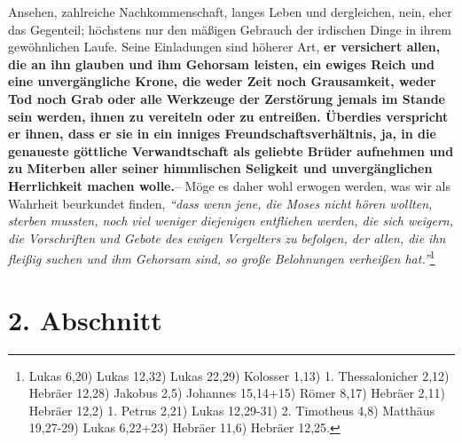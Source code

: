 Ansehen, zahlreiche Nachkommenschaft,
langes Leben und dergleichen, nein, eher das Gegenteil; höchstens nur den
mäßigen Gebrauch der irdischen Dinge in ihrem gewöhnlichen Laufe. Seine
Einladungen sind höherer Art,
\label{ref:16_01_warum_2}
\textbf{er versichert allen, die an ihn glauben und ihm
Gehorsam leisten, ein ewiges Reich und eine unvergängliche
Krone, die weder
Zeit noch Grausamkeit, weder Tod noch Grab oder alle Werkzeuge der Zerstörung
jemals im Stande sein werden, ihnen zu vereiteln oder zu entreißen. Überdies
verspricht er ihnen, dass er sie in ein inniges Freundschaftsverhältnis, ja, in
die genaueste göttliche Verwandtschaft als geliebte Brüder aufnehmen und zu
Miterben aller seiner himmlischen Seligkeit und unvergänglichen
Herrlichkeit
machen wolle.}-- Möge es daher wohl erwogen werden, was wir als Wahrheit
beurkundet finden,
\textit{"`dass wenn jene, die Moses nicht hören wollten, sterben
mussten, noch viel weniger diejenigen entfliehen werden, die sich weigern, die
Vorschriften und Gebote des ewigen Vergelters zu befolgen, der allen, die ihn
fleißig suchen und ihm Gehorsam sind, so große Belohnungen verheißen
hat."'}\footnote{
Lukas 6,20)
Lukas 12,32)
Lukas 22,29)
Kolosser 1,13)
1. Thessalonicher 2,12)
Hebräer 12,28)
Jakobus 2,5)
Johannes 15,14+15)
Römer 8,17)
Hebräer 2,11)
Hebräer 12,2)
1. Petrus 2,21)
Lukas 12,29-31)
2. Timotheus 4,8)
Matthäus 19,27-29)
Lukas 6,22+23)
Hebräer 11,6)
Hebräer 12,25.}

\section{2. Abschnitt} \label{kap16_ab2}

